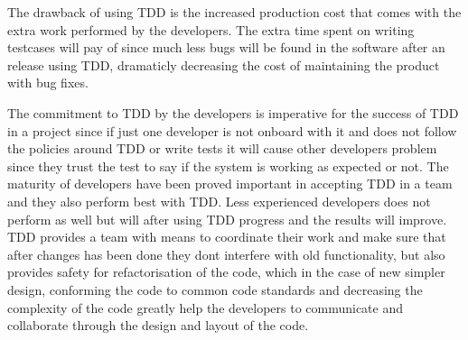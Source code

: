 The drawback of using TDD is the increased production cost that comes with the extra work performed by the developers.
The extra time spent on writing testcases will pay of since much less bugs will be found in the software after an release using TDD, dramaticly decreasing the cost of maintaining the product with bug fixes.

The commitment to TDD by the developers is imperative for the success of TDD in a project since if just one developer
is not onboard with it and does not follow the policies around TDD or write tests it will cause other developers problem since they
trust the test to say if the system is working as expected or not. The maturity of developers have been proved important in accepting TDD
in a team and they also perform best with TDD. Less experienced developers does not perform as well but will after using TDD progress and
the results will improve.
TDD provides a team with means to coordinate their work and make sure that after changes has been done they dont interfere with old functionality, but also provides safety for refactorisation of the code, which in the case of new simpler design, conforming the code to common code standards and decreasing the complexity of the code greatly help the developers to communicate and collaborate through the design and layout of the code. 

